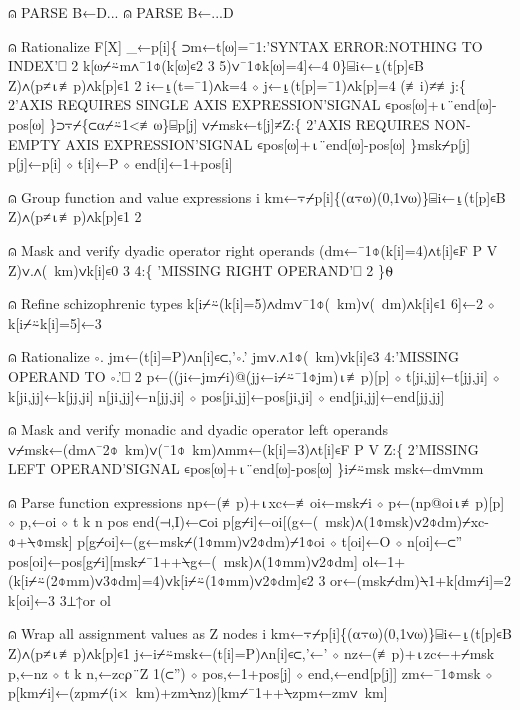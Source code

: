\documentclass{article}%
\begin{document}
⍝ PARSE B←D...
⍝ PARSE B←...D

⍝ Rationalize F[X]
         _←p[i]\{
                 ⊃m←t[⍵]=¯1:'SYNTAX ERROR:NOTHING TO INDEX'⎕ 2
                 k[⍵⌿⍨m∧¯1⌽(k[⍵]∊2 3 5)∨¯1⌽k[⍵]=4]←4
         0\}⌸i←⍸(t[p]∊B Z)∧(p≠⍳≢p)∧k[p]∊1 2
         i←⍸(t=¯1)∧k=4 ⋄ j←⍸(t[p]=¯1)∧k[p]=4
         (≢i)≠≢j:\{
                 2'AXIS REQUIRES SINGLE AXIS EXPRESSION'SIGNAL ∊pos[⍵]+⍳¨end[⍵]-pos[⍵]
         \}⊃⍪⌿\{⊂⍺⌿⍨1<≢⍵\}⌸p[j]
         ∨⌿msk←t[j]≠Z:\{
                 2'AXIS REQUIRES NON-EMPTY AXIS EXPRESSION'SIGNAL ∊pos[⍵]+⍳¨end[⍵]-pos[⍵]
         \}msk⌿p[j]
         p[j]←p[i] ⋄ t[i]←P ⋄ end[i]←1+pos[i]

⍝ Group function and value expressions
         i km←⍪⌿p[i]\{(⍺⍪⍵)(0,1∨⍵)\}⌸i←⍸(t[p]∊B Z)∧(p≠⍳≢p)∧k[p]∊1 2

⍝ Mask and verify dyadic operator right operands
         (dm←¯1⌽(k[i]=4)∧t[i]∊F P V Z)∨.∧(~km)∨k[i]∊0 3 4:\{
                 'MISSING RIGHT OPERAND'⎕ 2
         \}⍬

⍝ Refine schizophrenic types
         k[i⌿⍨(k[i]=5)∧dm∨¯1⌽(~km)∨(~dm)∧k[i]∊1 6]←2 ⋄ k[i⌿⍨k[i]=5]←3

⍝ Rationalize ∘.
         jm←(t[i]=P)∧n[i]∊⊂,'∘.'
         jm∨.∧1⌽(~km)∨k[i]∊3 4:'MISSING OPERAND TO ∘.'⎕ 2
         p←((ji←jm⌿i)@(jj←i⌿⍨¯1⌽jm)⍳≢p)[p] ⋄ t[ji,jj]←t[jj,ji] ⋄ k[ji,jj]←k[jj,ji]
         n[ji,jj]←n[jj,ji] ⋄ pos[ji,jj]←pos[ji,ji] ⋄ end[ji,jj]←end[jj,jj]

⍝ Mask and verify monadic and dyadic operator left operands
         ∨⌿msk←(dm∧¯2⌽~km)∨(¯1⌽~km)∧mm←(k[i]=3)∧t[i]∊F P V Z:\{
                 2'MISSING LEFT OPERAND'SIGNAL ∊pos[⍵]+⍳¨end[⍵]-pos[⍵]
         \}i⌿⍨msk
         msk←dm∨mm

⍝ Parse function expressions
         np←(≢p)+⍳xc←≢oi←msk⌿i ⋄ p←(np@oi⍳≢p)[p] ⋄ p,←oi ⋄ t k n pos end(⊣,I)←⊂oi
         p[g⌿i]←oi[(g←(~msk)∧(1⌽msk)∨2⌽dm)⌿xc-⌽+⍀⌽msk]
         p[g⌿oi]←(g←msk⌿(1⌽mm)∨2⌽dm)⌿1⌽oi ⋄ t[oi]←O ⋄ n[oi]←⊂''
         pos[oi]←pos[g⌿i][msk⌿¯1++⍀g←(~msk)∧(1⌽mm)∨2⌽dm]
         ol←1+(k[i⌿⍨(2⌽mm)∨3⌽dm]=4)∨k[i⌿⍨(1⌽mm)∨2⌽dm]∊2 3
         or←(msk⌿dm)⍀1+k[dm⌿i]=2
         k[oi]←3 3⊥↑or ol

⍝ Wrap all assignment values as Z nodes
         i km←⍪⌿p[i]\{(⍺⍪⍵)(0,1∨⍵)\}⌸i←⍸(t[p]∊B Z)∧(p≠⍳≢p)∧k[p]∊1
         j←i⌿⍨msk←(t[i]=P)∧n[i]∊⊂,'←' ⋄ nz←(≢p)+⍳zc←+⌿msk
         p,←nz ⋄ t k n,←zc⍴¨Z 1(⊂'') ⋄ pos,←1+pos[j] ⋄ end,←end[p[j]]
         zm←¯1⌽msk ⋄ p[km⌿i]←(zpm⌿(i×~km)+zm⍀nz)[km⌿¯1++⍀zpm←zm∨~km]
\end{document}
